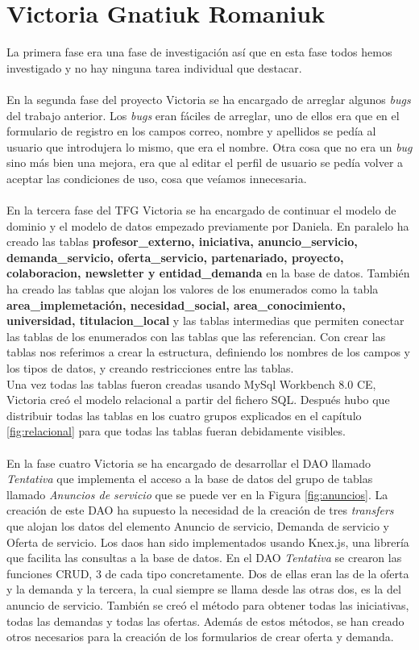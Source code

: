 \documentclass[11pt]{book}
\begin{document}
	\section{Victoria Gnatiuk Romaniuk}
	La primera fase era una fase de investigación así que en esta fase todos hemos investigado y no hay ninguna tarea individual que destacar.\\\\
	En la segunda fase del proyecto Victoria se ha encargado de arreglar algunos \textit{bugs} del trabajo anterior. Los \textit{bugs} eran fáciles de arreglar, uno de ellos era que en el formulario de registro en los campos correo, nombre y apellidos se pedía al usuario que introdujera lo mismo, que era el nombre. Otra cosa que no era un \textit{bug} sino más bien una mejora, era que al editar el perfil de usuario se pedía volver a aceptar las condiciones de uso, cosa que veíamos innecesaria.\\\\
	En la tercera fase del TFG Victoria se ha encargado de continuar el modelo de dominio y el modelo de datos empezado previamente por Daniela. En paralelo ha creado las tablas \textbf{profesor\_externo, iniciativa, anuncio\_servicio, demanda\_servicio, oferta\_servicio, partenariado, proyecto, colaboracion, newsletter y entidad\_demanda} en la base de datos. También ha creado las tablas que alojan los valores de los enumerados como la tabla \textbf{area\_implemetación, necesidad\_social, area\_conocimiento, universidad, titulacion\_local} y las tablas intermedias que permiten conectar las tablas de los enumerados con las tablas que las referencian. Con crear las tablas nos referimos a crear la estructura, definiendo los nombres de los campos y los tipos de datos, y creando restricciones entre las tablas.\\
	Una vez todas las tablas fueron creadas usando MySql Workbench 8.0 CE, Victoria creó el modelo relacional a partir del fichero SQL. Después hubo que distribuir todas las tablas en los cuatro grupos explicados en el capítulo \ref{fig:relacional} para que todas las tablas fueran debidamente visibles.\\\\
	En la fase cuatro Victoria se ha encargado de desarrollar el DAO llamado \textit{Tentativa} que implementa el acceso a la base de datos del grupo de tablas llamado \textit{Anuncios de servicio} que se puede ver en la Figura \ref{fig:anuncios}. La creación de este DAO ha supuesto la necesidad de la creación de tres \textit{transfers} que alojan los datos del elemento Anuncio de servicio, Demanda de servicio y Oferta de servicio. Los daos han sido implementados usando Knex.js, una librería que facilita las consultas a la base de datos. En el DAO \textit{Tentativa} se crearon las funciones CRUD, 3 de cada tipo concretamente. Dos de ellas eran las de la oferta y la demanda y la tercera, la cual siempre se llama desde las otras dos, es la del anuncio de servicio. También se creó el método para obtener todas las iniciativas, todas las demandas y todas las ofertas. Además de estos métodos, se han creado otros necesarios para la creación de los formularios de crear oferta y demanda. \\
\end{document}
